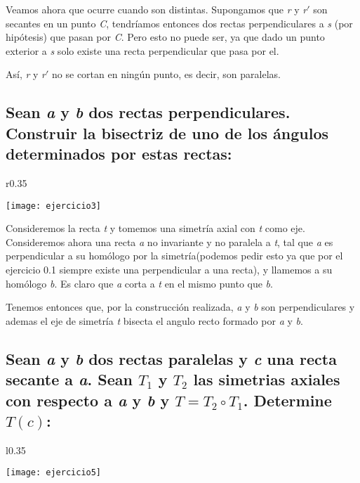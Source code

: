\documentclass[12pt,a4paper]{article}
\begin{document}
Veamos ahora que ocurre cuando son distintas. Supongamos que \textit{r} y \textit{r}\('\) son secantes en un punto \textit{C}, tendríamos entonces dos rectas perpendiculares a \textit{s} (por hipótesis) que pasan por \textit{C}. Pero esto no puede ser, ya que dado un punto exterior a \textit{s} solo existe una recta perpendicular que pasa por el.

Así, \textit{r} y \textit{r}\('\) no se cortan en ningún punto, es decir, son paralelas.

\vspace{1em}

\subsection{Sean \textit{a} y \textit{b} dos rectas perpendiculares. Construir la bisectriz de uno de los ángulos determinados por estas rectas:}

\begin{wrapfigure}[8]{r}{0.35\textwidth}
	\begin{center}
		\texttt{[image: ejercicio3]}
	\end{center}
\end{wrapfigure}

Consideremos la recta \textit{t} y tomemos una simetría axial con \textit{t} como eje. Consideremos ahora una recta \textit{a} no invariante y no paralela a \textit{t}, tal que \textit{a} es perpendicular a su homólogo por la simetría(podemos pedir esto ya que por el ejercicio 0.1 siempre existe una perpendicular a una recta), y llamemos a su homólogo \textit{b}. Es claro que \textit{a} corta a \textit{t} en el mismo punto que \textit{b}. 

Tenemos entonces que, por la construcción realizada, \textit{a} y \textit{b} son perpendiculares y ademas el eje de simetría \textit{t} bisecta el angulo recto formado por \textit{a} y \textit{b}.


\subsection{Sean \textit{a} y \textit{b} dos rectas paralelas y \textit{c} una recta secante a \textit{a}. Sean \(T_1\) y \(T_2\) las simetrias axiales con respecto a \textit{a} y \textit{b} y \(T=T_2 \circ T_1\). Determine \(T(c)\):}

\begin{wrapfigure}[9]{l}{0.35\textwidth}
	\begin{center}
		\texttt{[image: ejercicio5]}
	\end{center}
\end{wrapfigure}
\end{document}
